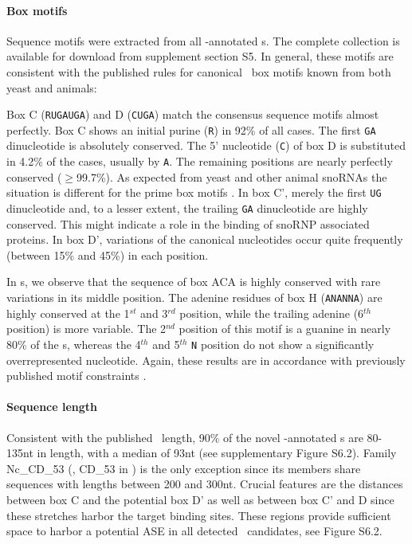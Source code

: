 \paragraph{\textbf{Box motifs}} Sequence motifs were extracted from
all \snostrip-annotated \sno s. The complete collection is available
for download from supplement section S5. In general, these motifs are
consistent with the published rules \cite{Xia:1997, Watkins:2000,
  Cahill:2002, Watkins:2002} for canonical \sno\ box motifs known from
both yeast and animals:

Box C (\texttt{RUGAUGA}) and D (\texttt{CUGA}) match the consensus
sequence motifs almost perfectly. Box C shows an initial purine
(\texttt{R}) in 92\% of all cases.  The first \texttt{GA} dinucleotide
is absolutely conserved.  The 5' nucleotide (\texttt{C}) of box D is
substituted in 4.2\% of the cases, usually by \texttt{A}. The
remaining positions are nearly perfectly conserved ($\ge$99.7\%). As
expected from yeast and other animal snoRNAs the situation is
different for the prime box motifs \cite{
  Cahill:2002,Kiss-László:1998}.  In box C', merely the first
\texttt{UG} dinucleotide and, to a lesser extent, the trailing
\texttt{GA} dinucleotide are highly conserved.  This might indicate a
role in the binding of snoRNP associated proteins.  In box D',
variations of the canonical nucleotides occur quite frequently
(between 15\% and 45\%) in each position.

In \haca s, we observe that the sequence of box ACA is highly
conserved with rare variations in its middle position. The adenine
residues of box H (\texttt{ANANNA}) are highly conserved at the
1$^{st}$ and 3$^{rd}$ position, while the trailing adenine (6$^{th}$
position) is more variable. The 2$^{nd}$ position of this motif is a
guanine in nearly 80\% of the \haca s, whereas the 4$^{th}$ and
5$^{th}$ \texttt{N} position do not show a significantly
overrepresented nucleotide. Again, these results are in accordance
with previously published motif constraints \cite{Normand:2006}.

\paragraph{\textbf{Sequence length}} Consistent with the published
\cd\ length, 90\% of the novel \snostrip-annotated \sno s are 80-135nt
in length, with a median of 93nt (see supplementary Figure S6.2).
Family Nc\_CD\_53 (\ncr, CD\_53 in \snostrip) is the only exception
since its members share sequences with lengths between 200 and 300nt.
Crucial features are the distances between box C and the potential box
D' as well as between box C' and D since these stretches harbor the
target binding sites. These regions provide sufficient space to harbor
a potential ASE in all detected \sno\ candidates, see Figure S6.2.

